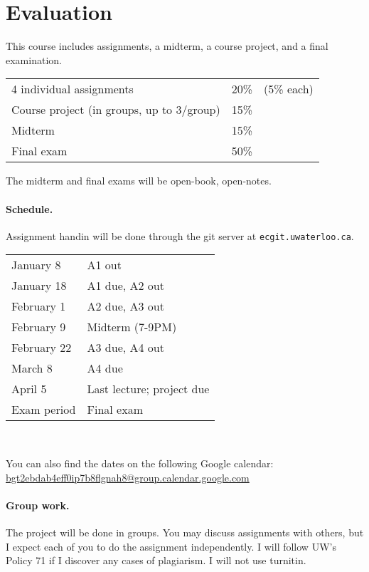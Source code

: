 \documentclass{article}
\begin{document}
\section*{Evaluation}
This course includes assignments, a midterm, a course project, and a final
examination.

\begin{tabular}{lrl}
4 individual assignments & 20\% & (5\% each) \\
Course project (in groups, up to 3/group) & 15\% \\
Midterm & 15\% \\
Final exam & 50\% \\
\end{tabular}

\noindent The midterm and final exams will be open-book, open-notes. 

\paragraph{Schedule.} Assignment handin will be done through the git server at {\tt ecgit.uwaterloo.ca}.\\[-1em]
\begin{center}
\begin{tabular}{ll}
January 8	&A1 out\\
January 18	&A1 due, A2 out\\
February 1	&A2 due, A3 out\\
February 9	&Midterm (7-9PM)\\
February 22	&A3 due, A4 out\\
March 8	        &A4 due\\
April 5 	&Last lecture; project due\\
Exam period	&Final exam
\end{tabular}~\\
\end{center}
You can also find the dates on the following Google calendar:\\
\hspace*{3em}\url{bgt2ebdab4eff0ip7b8flgnah8@group.calendar.google.com}

\paragraph{Group work.} The project will be done in groups.
You may discuss assignments with others, but I expect each of
you to do the assignment independently. I will follow UW's Policy 71
if I discover any cases of plagiarism. I will not use turnitin.
\end{document}
